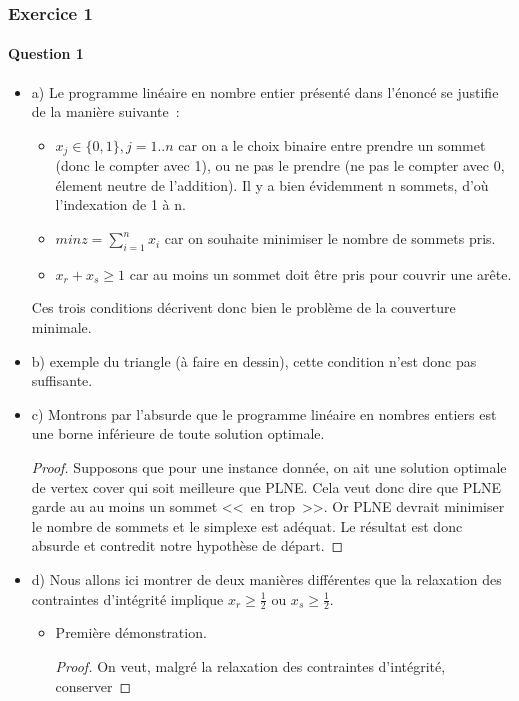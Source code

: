 \documentclass[a4paper, 12pt]{article}
\begin{document}
\subsubsection*{Exercice 1}

\paragraph{Question 1}

\begin{itemize}
\item[] a) Le programme linéaire en nombre entier présenté dans
  l'énoncé se justifie de la manière suivante~:
\begin{itemize}
\item $x_j \in \{0,1\}, j=1..n$ car on a le choix binaire entre prendre un
  sommet (donc le compter avec 1), ou ne pas le prendre (ne pas le
  compter avec 0, élement neutre de l'addition). Il y a bien
  évidemment n sommets, d'où l'indexation de 1 à n.
\item $min z = \sum^n _{i=1} x_i$ car on souhaite minimiser le nombre
  de sommets pris.
\item $x_r + x_s \geq 1$ car au moins un sommet doit être pris pour
  couvrir une arête.
\end{itemize}
Ces trois conditions décrivent donc bien le problème de la couverture minimale.
\item[] b) exemple du triangle (à faire en dessin), cette condition
  n'est donc pas suffisante.
\item[] c) Montrons par l'absurde que le programme linéaire en nombres
  entiers est une borne inférieure de toute solution optimale.
\begin{proof}
Supposons que pour une instance donnée, on ait une solution optimale
de vertex cover qui soit meilleure que PLNE. Cela veut donc dire que
PLNE garde au au moins un sommet <<~en trop~>>. Or PLNE devrait
minimiser le nombre de sommets et le simplexe est adéquat. Le résultat
est donc absurde et contredit notre hypothèse de départ.
\end{proof}
\item[] d) Nous allons ici montrer de deux manières différentes que la
  relaxation des contraintes d'intégrité implique $x_r \geq
  \frac{1}{2}$ ou $x_s \geq \frac{1}{2}$.
\begin{itemize}
\item Première démonstration.
\begin{proof}
On veut, malgré la relaxation des contraintes d'intégrité, conserver

\end{proof}
\end{itemize}
\end{itemize}
\end{document}
